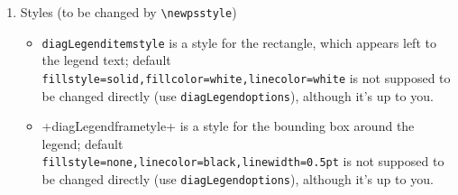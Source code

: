 \documentclass[12pt]{article}
\begin{document}
\begin{enumerate}
\begin{itemize}
          (default 6mm) is width of the
          colored rectangle; see 
        \item \verb+\legendRectHeight+ 
         (default 4mm) is height of the
          colored rectangle; see 
      \end{itemize}
\item Styles (to be changed by \verb+\newpsstyle+)
      \begin{itemize} 
        \item \verb+diagLegenditemstyle+ 
              is a style for the rectangle,
              which appears left to the legend text; default\\
              \verb+fillstyle=solid,fillcolor=white,linecolor=white+
          is not supposed to be changed directly (use
          \texttt{diagLegendoptions}), although it's up to you.
        \item+diagLegendframetyle+ 
              is a style for the bounding box
              around the legend; default\\
              \verb+fillstyle=none,linecolor=black,linewidth=0.5pt+
          is not supposed to be changed directly (use
          \texttt{diagLegendoptions}), although it's up to you.
      \end{itemize}
\end{enumerate}

\end{document}
